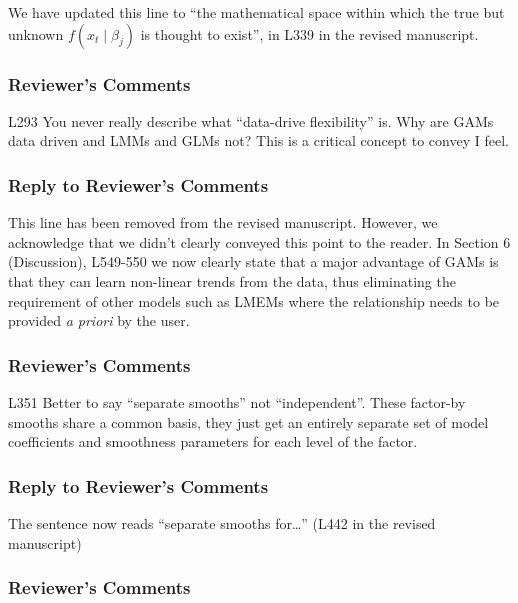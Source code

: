 \documentclass[
]{article}
\begin{document}
We have updated this line to ``the mathematical space within which the true but unknown \(f(x_t\mid \beta_j)\) is thought to exist'', in L339 in the revised manuscript.

\hypertarget{reviewers-comments-23}{%
\subsubsection{Reviewer's Comments}\label{reviewers-comments-23}}

L293 You never really describe what ``data-drive flexibility'' is. Why are GAMs data driven and LMMs and GLMs not? This is a critical concept to convey I feel.

\hypertarget{section-24}{%
\subsubsection{\texorpdfstring{\textcolor{reviewersblue} {Reply to Reviewer's Comments}}{}}\label{section-24}}

This line has been removed from the revised manuscript. However, we acknowledge that we didn't clearly conveyed this point to the reader. In Section 6 (Discussion), L549-550 we now clearly state that a major advantage of GAMs is that they can learn non-linear trends from the data, thus eliminating the requirement of other models such as LMEMs where the relationship needs to be provided \emph{a priori} by the user.

\hypertarget{reviewers-comments-24}{%
\subsubsection{Reviewer's Comments}\label{reviewers-comments-24}}

L351 Better to say ``separate smooths'' not ``independent''. These factor-by smooths share a common basis, they just get an entirely separate set of model coefficients and smoothness parameters for each level of the factor.

\hypertarget{section-25}{%
\subsubsection{\texorpdfstring{\textcolor{reviewersblue} {Reply to Reviewer's Comments}}{}}\label{section-25}}

The sentence now reads ``separate smooths for\ldots{}'' (L442 in the revised manuscript)

\hypertarget{reviewers-comments-25}{%
\subsubsection{Reviewer's Comments}\label{reviewers-comments-25}}
\end{document}
